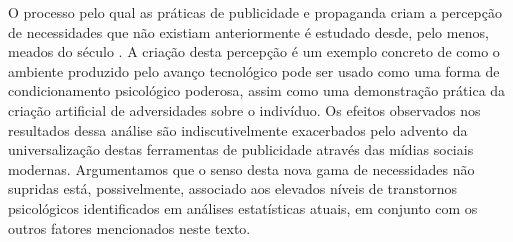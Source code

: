 O processo pelo qual as práticas de publicidade e propaganda criam a percepção de necessidades que não existiam anteriormente
é estudado desde, pelo menos, meados do século  \cite[3]{jameshulbert1968}. A criação desta percepção
é um exemplo concreto de como o ambiente produzido pelo avanço tecnológico
pode ser usado como uma forma de condicionamento psicológico poderosa, assim como uma demonstração prática da criação
artificial de adversidades sobre o indivíduo. Os efeitos observados nos
resultados dessa análise são indiscutivelmente exacerbados pelo advento da universalização destas ferramentas de
publicidade através das mídias sociais modernas. Argumentamos que o senso desta nova gama de necessidades não supridas
está, possivelmente, associado aos elevados níveis de transtornos psicológicos identificados em análises estatísticas
atuais, em conjunto com os outros fatores mencionados neste texto.
